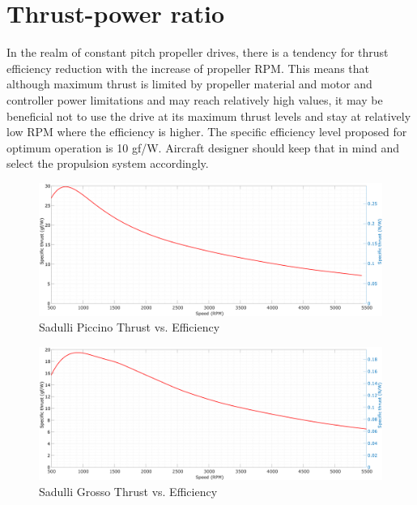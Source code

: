 \newpage

\section{Thrust-power ratio}

In the realm of constant pitch propeller drives, there is a tendency for thrust efficiency reduction 
with the increase of propeller RPM. This means that although maximum thrust is limited by propeller material 
and motor and controller power limitations and may reach relatively high values,  
it may be beneficial not to use the drive at its maximum thrust levels and stay at relatively low RPM 
where the efficiency is higher. The specific efficiency level proposed for optimum operation is 10 gf/W. 
Aircraft designer should keep that in mind and select the propulsion system accordingly.

\begin{figure}[!hbt]
    \centerline{\includegraphics[width=1\textwidth]{figures/thrust_graphs/piccino_specific_thrust-rpm.pdf}}
    \caption{Sadulli Piccino Thrust vs. Efficiency\label{Piccino_thrust_vs_efficiency}}
\end{figure}

\begin{figure}[!hbt]
    \centerline{\includegraphics[width=1\textwidth]{figures/thrust_graphs/grosso_specific_thrust-rpm.pdf}}
    \caption{Sadulli Grosso Thrust vs. Efficiency\label{Grosso_thrust_vs_efficiency}}
\end{figure}
